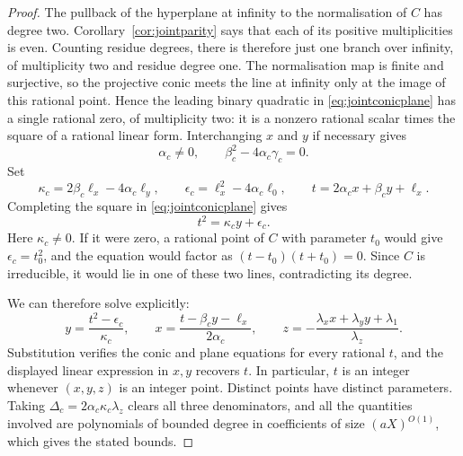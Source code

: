 \documentclass[11pt]{article}
\theoremstyle{definition}
\theoremstyle{remark}
\begin{document}
\begin{proof}
The pullback of the hyperplane at infinity to the normalisation of $C$
has degree two. Corollary~\ref{cor:jointparity} says
that each of its positive multiplicities is even. Counting residue
degrees, there is therefore just one branch over infinity, of
multiplicity two and residue degree one. The normalisation map is
finite and surjective, so the projective conic meets the line at
infinity only at the image of this rational point. Hence the leading
binary quadratic in \eqref{eq:jointconicplane} has a single rational
zero, of multiplicity two: it is a nonzero rational scalar times the
square of a rational linear form. Interchanging $x$ and $y$ if necessary gives
\[
 \alpha_c\ne0,\qquad \beta_c^2-4\alpha_c\gamma_c=0.
\]
Set
\[
 \kappa_c=2\beta_c\ell_x-4\alpha_c\ell_y,\qquad
 \epsilon_c=\ell_x^2-4\alpha_c\ell_0,\qquad
 t=2\alpha_c x+\beta_c y+\ell_x.
\]
Completing the square in \eqref{eq:jointconicplane} gives
\begin{equation}\label{eq:jointconicparameter}
 t^2=\kappa_c y+\epsilon_c.
\end{equation}
Here $\kappa_c\ne0$. If it were zero, a rational point of $C$ with
parameter $t_0$ would give $\epsilon_c=t_0^2$, and the equation would
factor as $(t-t_0)(t+t_0)=0$. Since $C$ is irreducible, it would lie in
one of these two lines, contradicting its degree.

We can therefore solve explicitly:
\[
 y=\frac{t^2-\epsilon_c}{\kappa_c},\qquad
 x=\frac{t-\beta_c y-\ell_x}{2\alpha_c},\qquad
 z=-\frac{\lambda_xx+\lambda_yy+\lambda_1}{\lambda_z}.
\]
Substitution verifies the conic and plane equations for every rational
$t$, and the displayed linear expression in $x,y$ recovers $t$.
In particular, $t$ is an integer whenever $(x,y,z)$ is an integer point.
Distinct points have distinct parameters.
Taking $\Delta_c=2\alpha_c\kappa_c\lambda_z$ clears all three denominators, and all
the quantities involved are polynomials of bounded degree in coefficients of
size $(aX)^{O(1)}$, which gives the stated bounds.
\end{proof}
\end{document}
